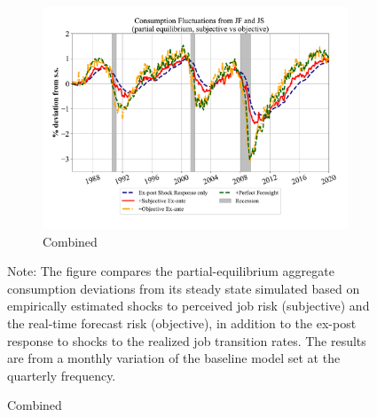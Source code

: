 \begin{figure}[ht]
\begin{subfigure}{0.32\linewidth}
    \end{subfigure}
    \hfill
    \begin{subfigure}{0.32\linewidth}
         \caption*{Combined}
        \includegraphics[width=\linewidth]{Figures/consumption_pe_JS_JF_deviation_machine_as_rational_monthly.pdf}
   
    \end{subfigure}

    \begin{flushleft}
        \footnotesize 
        Note: The figure compares the partial-equilibrium aggregate consumption deviations from its steady state simulated based on empirically estimated shocks to perceived job risk (subjective) and the real-time forecast risk (objective), in addition to the ex-post response to shocks to the realized job transition rates. The results are from a monthly variation of the baseline model set at the quarterly frequency.
    \end{flushleft}
\end{figure}

